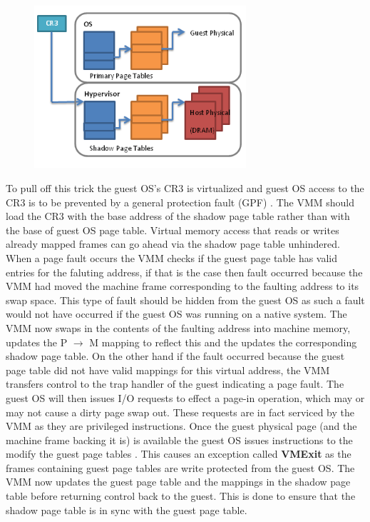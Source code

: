 \begin{figure}[tbp]
  \begin{center}
    \includegraphics[width=0.7\textwidth]{images/shadowpagetables}
    \label{fig:shadowpagetables}
     \end{center}
\end{figure}
To pull off this trick the guest OS's CR3 is virtualized and guest OS access to the CR3 is to be
prevented by a general protection fault (GPF) \citep{wiki1}. The VMM should load the CR3 with the
base address of the shadow page table rather than with the base of guest OS page table. Virtual
memory access that reads or writes already mapped frames can go ahead via the shadow page table
unhindered. When a page fault occurs the VMM checks if the guest page table has valid entries for
the faluting address, if that is the case then fault occurred because the VMM had moved the
machine frame corresponding to the faulting address to its swap space. This type of fault should
be hidden from the guest OS as such a fault would not have occurred if the guest OS was running on
a native system. The VMM now swaps in the contents of the faulting address into machine memory,
updates the P $\rightarrow$ M mapping to reflect this and the updates the corresponding shadow
page table. On the other hand if the fault occurred because the guest page table did not have
valid mappings for this virtual address, the VMM transfers control to the trap handler of the
guest indicating a page fault. The guest OS will then issues I/O requests to effect a page-in
operation, which may or may not cause a dirty page swap out. These requests are in fact serviced
by the VMM as they are privileged instructions. Once the guest physical page (and the machine
frame backing it is) is available the guest OS issues instructions to the modify the guest page
tables \citep{smith2005virtual}. This causes an exception called \textbf{VMExit} as the frames
containing guest page tables are write protected from the guest OS. The VMM now updates the guest
page table and the mappings in the shadow page table before returning control back to the guest.
This is done to ensure that the shadow page table is in sync with the guest page table.  
